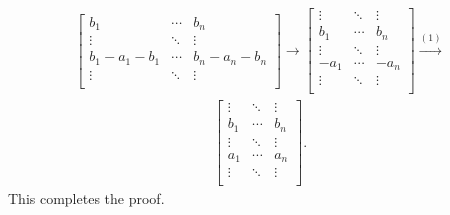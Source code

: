 \documentclass[12pt]{article}
\begin{document}
\begin{enumerate}
\begin{align*}
\begin{bmatrix}
          b_1 & \cdots & b_n \\
          \vdots   & \ddots & \vdots\\
          b_1 - a_1 - b_1 & \cdots & b_n - a_n - b_n\\
          \vdots   & \ddots & \vdots\\
        \end{bmatrix}
        \xrightarrow{}
        \begin{bmatrix}
          \vdots   & \ddots & \vdots\\
          b_1 & \cdots & b_n \\
          \vdots   & \ddots & \vdots\\
          - a_1 & \cdots & - a_n \\
          \vdots   & \ddots & \vdots\\
        \end{bmatrix}
        \xrightarrow{(1)}
      \end{align*}
      \begin{align*}
        \begin{bmatrix}
          \vdots   & \ddots & \vdots\\
          b_1 & \cdots & b_n \\
          \vdots   & \ddots & \vdots\\
          a_1 & \cdots & a_n \\
          \vdots   & \ddots & \vdots\\
        \end{bmatrix}.
      \end{align*}
    This completes the proof.

\end{enumerate}
\end{document}
